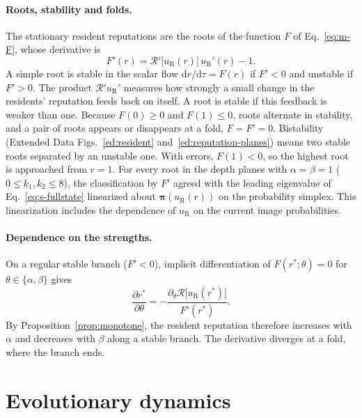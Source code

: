 \documentclass[10pt]{wlscirep}
\newcommand{\Rmap}{\mathscr{R}}            %
\newcommand{\dd}{\mathrm{d}}
\theoremstyle{plain}
\theoremstyle{remark}
\begin{document}
\paragraph{Roots, stability and folds.} The stationary resident reputations are the roots of the function $F$ of Eq.~\eqref{eq:m-F}, whose derivative is
\begin{equation}
F'(r)=\Rmap'\bigl[u_{\mathrm R}(r)\bigr]\,u_{\mathrm R}'(r)-1.
\label{eq:s-F}
\end{equation}
A simple root is stable in the scalar flow $\dd r/\dd\tau=F(r)$ if $F'<0$ and unstable if $F'>0$. The product $\Rmap'u_{\mathrm R}'$ measures how strongly a small change in the residents' reputation feeds back on itself. A root is stable if this feedback is weaker than one. Because $F(0)\geq0$ and $F(1)\leq0$, roots alternate in stability, and a pair of roots appears or disappears at a fold, $F=F'=0$. Bistability (Extended Data Figs.~\ref{ed:resident} and~\ref{ed:reputation-planes}) means two stable roots separated by an unstable one. With errors, $F(1)<0$, so the highest root is approached from $r=1$. For every root in the depth planes with $\alpha=\beta=1$ ($0\leq k_1,k_2\leq8$), the classification by $F'$ agreed with the leading eigenvalue of Eq.~\eqref{eq:s-fullstate} linearized about $\bm\pi(u_{\mathrm R}(r))$ on the probability simplex. This linearization includes the dependence of $u_{\mathrm R}$ on the current image probabilities.

\paragraph{Dependence on the strengths.} On a regular stable branch ($F'<0$), implicit differentiation of $F(r^*;\theta)=0$ for $\theta\in\{\alpha,\beta\}$ gives
\begin{equation}
\frac{\partial r^*}{\partial\theta}=-\frac{\partial_\theta\Rmap\bigl[u_{\mathrm R}(r^*)\bigr]}{F'(r^*)}.
\label{eq:s-sensitivity}
\end{equation}
By Proposition~\ref{prop:monotone}, the resident reputation therefore increases with $\alpha$ and decreases with $\beta$ along a stable branch. The derivative diverges at a fold, where the branch ends.

\FloatBarrier
\section{Evolutionary dynamics}
\label{si:evolution}
\end{document}
